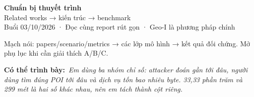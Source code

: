 \documentclass[10pt,a4paper]{article}
\newcommand{\key}[1]{\par\smallskip\noindent\colorbox{pale}{\parbox{\dimexpr\linewidth-2\fboxsep}{#1}}\par\smallskip}
\newcommand{\say}[1]{\par\textbf{Có thể trình bày:}\ \textit{#1}\par}
\begin{document}
\begin{center}
{\LARGE\bfseries\color{ink}Chuẩn bị thuyết trình}\\[5pt]
{\large Related works → kiến trúc → benchmark}\\[3pt]
{\small Buổi 03/10/2026 · Đọc cùng report rút gọn · Geo-I là phương pháp chính}
\end{center}
\key{Mạch nói: papers/scenario/metrics → các lớp mô hình → kết quả đối chứng. Mở phụ lục khi cần giải thích A/B/C.}


\clearpage

\say{Em dùng ba nhóm chỉ số: attacker đoán gần tới đâu, người dùng tìm đúng POI tới đâu và dịch vụ tốn bao nhiêu byte. 33,33 phần trăm và 299 mét là hai số khác nhau, nên em tách thành cột riêng.}

\clearpage


\clearpage


\clearpage

\end{document}
